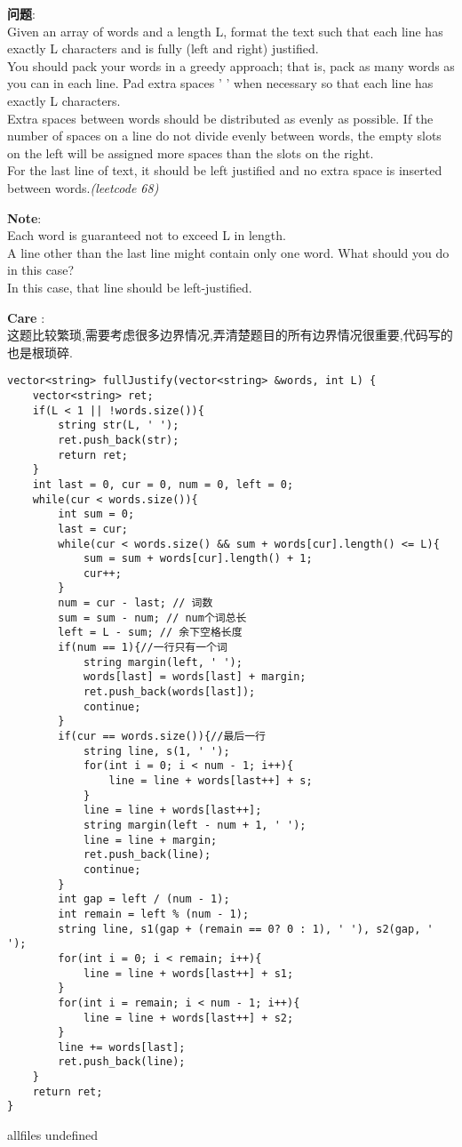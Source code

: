 \documentclass{article}
\begin{document}
\begin{CJK}{UTF8}{gbsn}     %

\else
    
\begin{description}
    \item{\textbf{问题}}: \\
	Given an array of words and a length L, format the text such that each line has exactly L characters and is fully (left and right) justified.\\
You should pack your words in a greedy approach; that is, pack as many words as you can in each line. Pad extra spaces ' ' when necessary so that each line has exactly L characters.\\
Extra spaces between words should be distributed as evenly as possible. If the number of spaces on a line do not divide evenly between words, the empty slots on the left will be assigned more spaces than the slots on the right.\\
For the last line of text, it should be left justified and no extra space is inserted between words.\textit{(leetcode 68)}
	\item{\textbf{Note}}:\\
	Each word is guaranteed not to exceed L in length.\\
	A line other than the last line might contain only one word. What should you do in this case?\\
	In this case, that line should be left-justified.
    \item{\textbf{Care}} : 
    \\这题比较繁琐,需要考虑很多边界情况,弄清楚题目的所有边界情况很重要,代码写的也是根琐碎.
    \begin{lstlisting}
vector<string> fullJustify(vector<string> &words, int L) {
	vector<string> ret;
	if(L < 1 || !words.size()){ 
		string str(L, ' ');
		ret.push_back(str);	
		return ret;
	}
	int last = 0, cur = 0, num = 0, left = 0;
	while(cur < words.size()){
		int sum = 0;
		last = cur;
		while(cur < words.size() && sum + words[cur].length() <= L){
			sum = sum + words[cur].length() + 1;
			cur++;
		}
		num = cur - last; // 词数
		sum = sum - num; // num个词总长
		left = L - sum; // 余下空格长度
		if(num == 1){//一行只有一个词
			string margin(left, ' ');
			words[last] = words[last] + margin;
			ret.push_back(words[last]);
			continue;
		}
		if(cur == words.size()){//最后一行
			string line, s(1, ' ');
			for(int i = 0; i < num - 1; i++){
				line = line + words[last++] + s;
			}
			line = line + words[last++];
			string margin(left - num + 1, ' ');
			line = line + margin;
			ret.push_back(line);
			continue;
		}
		int gap = left / (num - 1);
		int remain = left % (num - 1);
		string line, s1(gap + (remain == 0? 0 : 1), ' '), s2(gap, ' ');
		for(int i = 0; i < remain; i++){
			line = line + words[last++] + s1;
		}
		for(int i = remain; i < num - 1; i++){
			line = line + words[last++] + s2;
		}
		line += words[last];
		ret.push_back(line);
	}
	return ret;
}
    \end{lstlisting}
\end{description}

\fi

\ifx allfiles undefined
\end{CJK}
\end{document}
